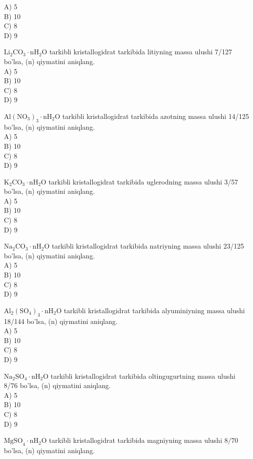 A) 5\\
B) 10\\
C) 8\\
D) 9
  \item $\mathrm{Li}_{2} \mathrm{CO}_{3} \cdot \mathrm{nH}_{2} \mathrm{O}$ tarkibli kristallogidrat tarkibida litiyning massa ulushi 7/127 bo'lsa, (n) qiymatini aniqlang.\\
A) 5\\
B) 10\\
C) 8\\
D) 9
  \item $\mathrm{Al}\left(\mathrm{NO}_{3}\right)_{3} \cdot \mathrm{nH}_{2} \mathrm{O}$ tarkibli kristallogidrat tarkibida azotning massa ulushi 14/125 bo'lsa, (n) qiymatini aniqlang.\\
A) 5\\
B) 10\\
C) 8\\
D) 9
  \item $\mathrm{K}_{2} \mathrm{CO}_{3} \cdot \mathrm{nH}_{2} \mathrm{O}$ tarkibli kristallogidrat tarkibida uglerodning massa ulushi 3/57 bo'lsa, (n) qiymatini aniqlang.\\
A) 5\\
B) 10\\
C) 8\\
D) 9
  \item $\mathrm{Na}_{2} \mathrm{CO}_{3} \cdot \mathrm{nH}_{2} \mathrm{O}$ tarkibli kristallogidrat tarkibida natriyning massa ulushi 23/125 bo'lsa, (n) qiymatini aniqlang.\\
A) 5\\
B) 10\\
C) 8\\
D) 9
  \item $\mathrm{Al}_{2}\left(\mathrm{SO}_{4}\right)_{3} \cdot \mathrm{nH}_{2} \mathrm{O}$ tarkibli kristallogidrat tarkibida alyuminiyning massa ulushi 18/144 bo'lsa, (n) qiymatini aniqlang.\\
A) 5\\
B) 10\\
C) 8\\
D) 9
  \item $\mathrm{Na}_{2} \mathrm{SO}_{4} \cdot \mathrm{nH}_{2} \mathrm{O}$ tarkibli kristallogidrat tarkibida oltingugurtning massa ulushi 8/76 bo'lsa, (n) qiymatini aniqlang.\\
A) 5\\
B) 10\\
C) 8\\
D) 9
  \item $\mathrm{MgSO}_{4} \cdot \mathrm{nH}_{2} \mathrm{O}$ tarkibli kristallogidrat tarkibida magniyning massa ulushi $8 / 70$ bo'lsa, (n) qiymatini aniqlang.\\
